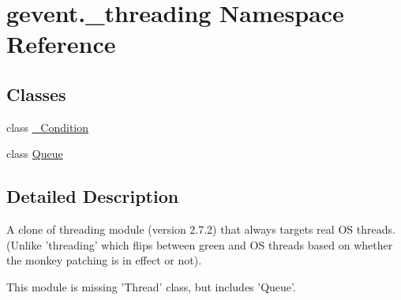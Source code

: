 \hypertarget{namespacegevent_1_1__threading}{}\section{gevent.\+\_\+threading Namespace Reference}
\label{namespacegevent_1_1__threading}
\subsection*{Classes}
\begin{DoxyCompactItemize}
\item 
class \hyperlink{classgevent_1_1__threading_1_1___condition}{\+\_\+\+Condition}
\item 
class \hyperlink{classgevent_1_1__threading_1_1_queue}{Queue}
\end{DoxyCompactItemize}


\subsection{Detailed Description}
\begin{DoxyVerb}A clone of threading module (version 2.7.2) that always
targets real OS threads. (Unlike 'threading' which flips between
green and OS threads based on whether the monkey patching is in effect
or not).

This module is missing 'Thread' class, but includes 'Queue'.
\end{DoxyVerb}
 